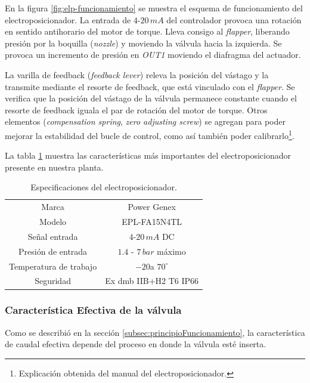 En la figura \ref{fig:elp-funcionamiento} se muestra el esquema de
funcionamiento del electroposicionador.
La entrada de $4$-$20\,mA$ del controlador provoca una rotación en sentido
antihorario del motor de torque.
Lleva consigo al \emph{flapper}, liberando
presión por la boquilla (\emph{nozzle}) y moviendo la válvula hacia la
izquierda.
Se provoca un incremento de presión en \emph{OUT1} moviendo el diafragma del
actuador.

La varilla de feedback (\emph{feedback lever}) releva la posición del vástago y
la transmite mediante el resorte de feedback, que está vinculado con el
\emph{flapper}.
Se verifica que la posición del vástago de la válvula permanece constante
cuando el resorte de feedback iguala el par de rotación del motor de torque.
Otros elementos (\emph{compensation spring}, \emph{zero adjusting screw}) se
agregan para poder mejorar la estabilidad del bucle de control, como así
también poder calibrarlo\footnote{Explicación obtenida del manual del
electroposicionador.}.

La tabla \ref{tab:especifElectroP} muestra las características más importantes
del electroposicionador presente en nuestra planta.

\begin{table}
 \centering
 \begin{tabular}{|c|c|}
  \hline
  Marca & Power Genex\\
  Modelo & EPL-FA15N4TL\\
  Señal entrada & $4$-$20\,mA$ DC\\
  Presión de entrada & $1.4$ - $7\,bar$ máximo\\
  Temperatura de trabajo & $-20$a $70^\circ$\\
  Seguridad & Ex dmb IIB+H2 T6 IP66\\
  \hline
 \end{tabular}
 \caption{Especificaciones del electroposicionador.}
 \label{tab:especifElectroP}
\end{table}

\subsubsection{Característica Efectiva de la válvula}

Como se describió en la sección \ref{subsec:principioFuncionamiento}, la
característica de caudal efectiva depende del proceso en donde la válvula esté
inserta.

